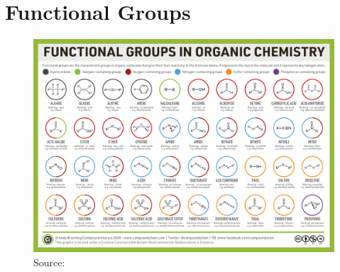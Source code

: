 


\section{Functional Groups}\label{appendix:fngroups}
\begin{figure}[H]
\centering
\includegraphics[width=.9\textheight,angle=90]{fngroups.png}
{Source:\cite{fgps}}
\end{figure}
